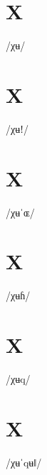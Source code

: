 \documentclass[10pt,a4paper,twoside]{book}
\begin{document}
\section*{X}

\begin{multicols}{3}
 {/χʉ/} {}
\end{multicols}

\section*{X}

\begin{multicols}{3}
 {/χʉǃ/} {}
\end{multicols}

\section*{X}

\begin{multicols}{3}
 {/χʉˈɶ/} {}
\end{multicols}

\section*{X}

\begin{multicols}{3}
 {/χʉɦ/} {}
\end{multicols}

\section*{X}

\begin{multicols}{3}
 {/χʉq/} {}
\end{multicols}

\section*{X}

\begin{multicols}{3}
 {/χʉˈqʉǁ/} {}
\end{multicols}
\end{document}
